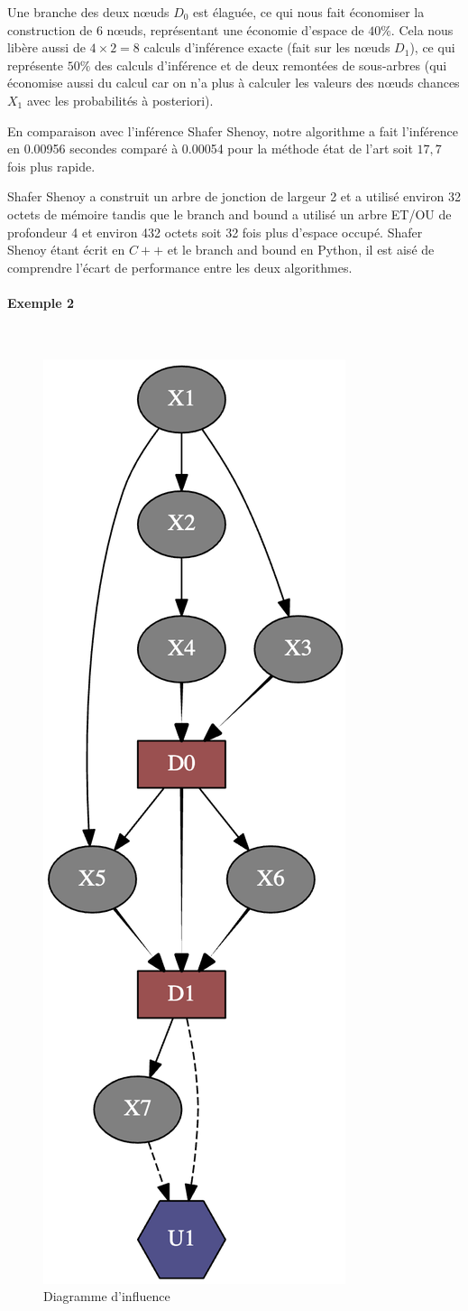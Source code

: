 \documentclass[12pt]{article}
\newcommand{\subsubsubsection}[1]{\paragraph{#1}\mbox{}\\}
\begin{document}
Une branche des deux nœuds $D_0$ est élaguée, ce qui nous fait économiser la construction de 6 nœuds, représentant une économie d'espace de $40\%$. Cela nous libère aussi de $4\times 2=8$ calculs d'inférence exacte (fait sur les nœuds $D_1$), ce qui représente $50\%$ des calculs d'inférence et de deux remontées de sous-arbres (qui économise aussi du calcul car on n'a plus à calculer les valeurs des nœuds chances $X_1$ avec les probabilités à posteriori).

En comparaison avec l'inférence Shafer Shenoy, notre algorithme a fait l'inférence en 0.00956 secondes comparé à 0.00054 pour la méthode état de l'art soit $17,7$ fois plus rapide. 

Shafer Shenoy a construit un arbre de jonction de largeur 2 et a utilisé environ 32 octets de mémoire tandis que le branch and bound a utilisé un arbre ET/OU de profondeur 4 et environ 432 octets soit 32 fois plus d'espace occupé. Shafer Shenoy étant écrit en $C++$ et le branch and bound en Python, il est aisé de comprendre l'écart de performance entre les deux algorithmes.
\subsubsubsection{Exemple 2}
\begin{figure}[ht]
\centering
\includegraphics[width=0.2\linewidth]{docs/ressources_rapport/exempleID2.png}
 \caption{Diagramme d'influence}
\end{figure}
\end{document}
